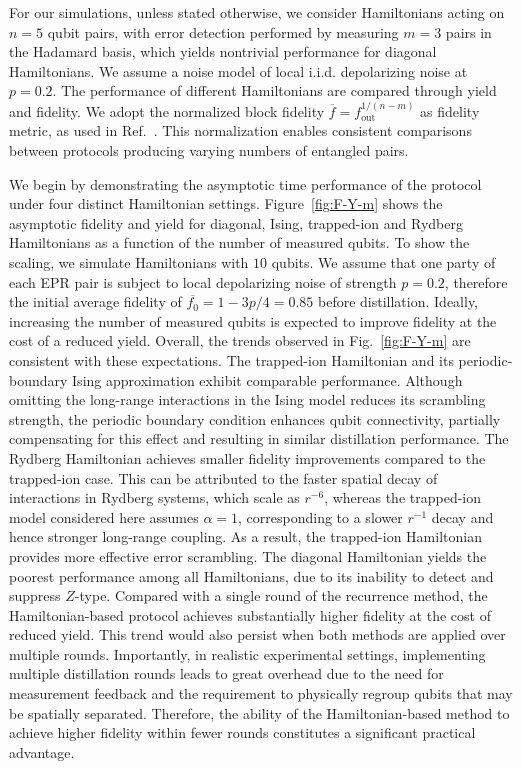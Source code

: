 \documentclass[onecolumn,prx,longbibliography,nofootinbib, superscriptaddress]{revtex4-2}
\theoremstyle{recap}
\begin{document}
For our simulations, unless stated otherwise, we consider Hamiltonians acting on $n=5$ qubit pairs, with error detection performed by measuring $m=3$ pairs in the Hadamard basis, which yields nontrivial performance for diagonal Hamiltonians. We assume a noise model of local i.i.d. depolarizing noise at $p=0.2$. The performance of different Hamiltonians are compared through yield and fidelity. We adopt the normalized block fidelity $\overline{f} = f_{\text{out}}^{1/(n-m)}$ as fidelity metric, as used in Ref.~\cite{gu2025}. This normalization enables consistent comparisons between protocols producing varying numbers of entangled pairs.

We begin by demonstrating the asymptotic time performance of the protocol under four distinct Hamiltonian settings. Figure~\ref{fig:F-Y-m} shows the asymptotic fidelity and yield for diagonal, Ising, trapped-ion and Rydberg Hamiltonians as a function of the number of measured qubits. To show the scaling, we simulate Hamiltonians with $10$ qubits. We assume that one party of each EPR pair is subject to local depolarizing noise of strength $p = 0.2$, therefore the initial average fidelity of $\overline{f_0} = 1 - 3p/4 = 0.85$ before distillation. Ideally, increasing the number of measured qubits is expected to improve fidelity at the cost of a reduced yield. Overall, the trends observed in Fig.~\ref{fig:F-Y-m} are consistent with these expectations. The trapped-ion Hamiltonian and its periodic-boundary Ising approximation exhibit comparable performance. Although omitting the long-range interactions in the Ising model reduces its scrambling strength, the periodic boundary condition enhances qubit connectivity, partially compensating for this effect and resulting in similar distillation performance. The Rydberg Hamiltonian achieves smaller fidelity improvements compared to the trapped-ion case. This can be attributed to the faster spatial decay of interactions in Rydberg systems, which scale as $r^{-6}$, whereas the trapped-ion model considered here assumes $\alpha=1$, corresponding to a slower $r^{-1}$ decay and hence stronger long-range coupling. As a result, the trapped-ion Hamiltonian provides more effective error scrambling. The diagonal Hamiltonian yields the poorest performance among all Hamiltonians, due to its inability to detect and suppress $Z$-type. Compared with a single round of the recurrence method, the Hamiltonian-based protocol achieves substantially higher fidelity at the cost of reduced yield. This trend would also persist when both methods are applied over multiple rounds. Importantly, in realistic experimental settings, implementing multiple distillation rounds leads to great overhead due to the need for measurement feedback and the requirement to physically regroup qubits that may be spatially separated. Therefore, the ability of the Hamiltonian-based method to achieve higher fidelity within fewer rounds constitutes a significant practical advantage.
\end{document}
